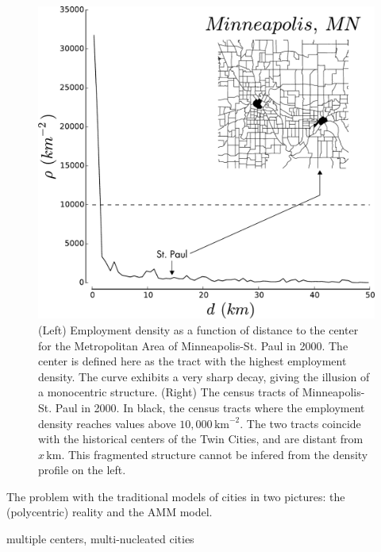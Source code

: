 \begin{figure}
    \centering
    \includegraphics[width=\textwidth]{./gfx/chapter-monocentric/distance_center_minneapolis.pdf}
    \caption{(Left) Employment density as a function of distance to the center for the
    Metropolitan Area of Minneapolis-St. Paul in 2000. The center is defined here as the
    tract with the highest employment density. The curve exhibits a very sharp
    decay, giving the illusion of a monocentric structure. (Right) The census tracts
    of Minneapolis-St. Paul in 2000. In black, the census tracts where the
    employment density reaches values above $10,000\,\text{km}^{-2}$. The two tracts
    coincide with the historical centers of the Twin Cities, and are distant from
    $x\,\text{km}$. This fragmented structure cannot be infered from the density
    profile on the left.
    \label{fig:distance_center_Minneapolis}}
\end{figure}

The problem with the traditional models of cities in two pictures: the
(polycentric) reality and the AMM model.

\cite{Harris:1945} multiple centers, multi-nucleated cities\\

